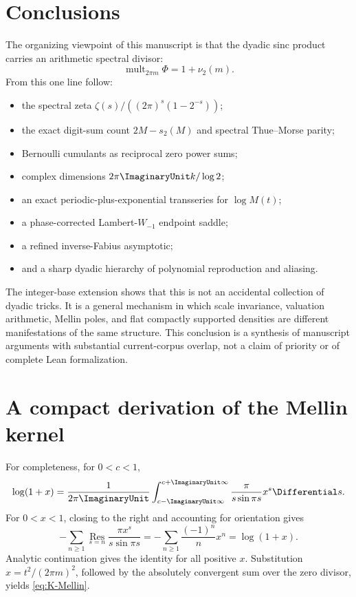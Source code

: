 \documentclass[11pt,oneside]{article}
\theoremstyle{definition}
\theoremstyle{remark}
\begin{document}
\section{Conclusions}

The organizing viewpoint of this manuscript is that the dyadic sinc product
carries an arithmetic spectral divisor:
\[
 \operatorname{mult}_{2\pi m}\Phi=1+\nu_2(m).
\]
From this one line follow:
\begin{itemize}[leftmargin=2em]
\item the spectral zeta
      \(\zeta(s)/((2\pi)^s(1-2^{-s}))\);
\item the exact digit-sum count \(2M-s_2(M)\) and spectral Thue--Morse parity;
\item Bernoulli cumulants as reciprocal zero power sums;
\item complex dimensions \(2\pi\ImaginaryUnit k/\log2\);
\item an exact periodic-plus-exponential transseries for \(\log M(t)\);
\item a phase-corrected Lambert-\(W_{-1}\) endpoint saddle;
\item a refined inverse-Fabius asymptotic;
\item and a sharp dyadic hierarchy of polynomial reproduction and aliasing.
\end{itemize}
The integer-base extension shows that this is not an accidental collection of
dyadic tricks.  It is a general mechanism in which scale invariance,
valuation arithmetic, Mellin poles, and flat compactly supported densities
are different manifestations of the same structure.  This conclusion is a
synthesis of manuscript arguments with substantial current-corpus overlap,
not a claim of priority or of complete Lean formalization.

\appendix

\section{A compact derivation of the Mellin kernel}

For completeness, for \(0<c<1\),
\[
 \log(1+x)
 =\frac1{2\pi\ImaginaryUnit}
  \int_{c-\ImaginaryUnit\infty}^{c+\ImaginaryUnit\infty}
  \frac{\pi}{s\sin\pi s}x^s\Differential s.
\]
For \(0<x<1\), closing to the right and accounting for orientation gives
\[
 -\sum_{n\geq1}\operatorname*{Res}_{s=n}
 \frac{\pi x^s}{s\sin\pi s}
 =-\sum_{n\geq1}\frac{(-1)^n}{n}x^n
 =\log(1+x).
\]
Analytic continuation gives the identity for all positive \(x\).
Substitution \(x=t^2/(2\pi m)^2\), followed by the absolutely convergent
sum over the zero divisor, yields \eqref{eq:K-Mellin}.
\end{document}
